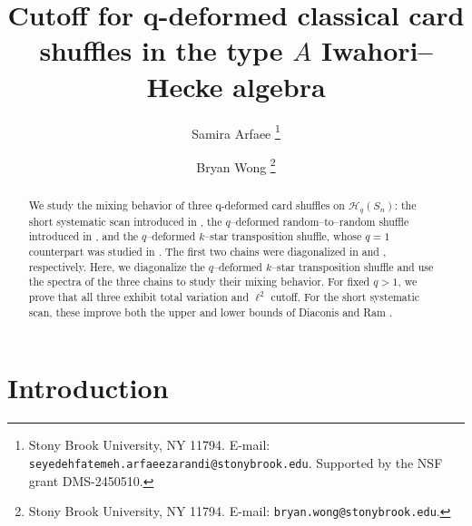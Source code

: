 \documentclass[11pt]{article}
\title{Cutoff for q-deformed classical card shuffles in the type $A$ Iwahori--Hecke algebra}
\author{
Samira Arfaee \thanks{Stony Brook University, NY 11794. E-mail: \texttt{seyedehfatemeh.arfaeezarandi@stonybrook.edu}. Supported by the NSF grant DMS-2450510.} 
\and 
Bryan Wong \thanks{Stony Brook University, NY 11794. E-mail: \texttt{bryan.wong@stonybrook.edu}.}
}
\date{}
\theoremstyle{plain}  %
\begin{document}
\maketitle  

\begin{abstract}

We study the mixing behavior of three q-deformed card shuffles on $\mathcal{H}_q(S_n)$: the short systematic scan introduced in \cite{DiaconisRam2000}, the $q$--deformed random--to--random shuffle introduced in \cite{AxelrodFreedBraunerChiangComminsLang2024}, and the $q$--deformed $k$--star transposition shuffle, whose $q=1$ counterpart was studied in \cite{arfaee2025shuffling}. The first two chains were diagonalized in \cite{DiaconisRam2000} and \cite{AxelrodFreedBraunerChiangComminsLang2024}, respectively. Here, we diagonalize the $q$--deformed $k$--star transposition shuffle and use the spectra of the three chains to study their mixing behavior. For fixed $q>1$, we prove that all three exhibit total variation and $\ell^2$ cutoff. For the short systematic scan, these improve both the upper and lower bounds of Diaconis and Ram \cite{DiaconisRam2000}.





\end{abstract}

\section{Introduction}
\end{document}
